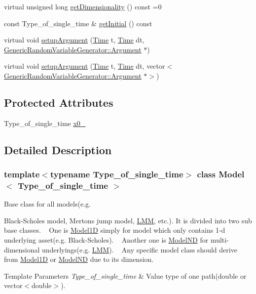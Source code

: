 \begin{DoxyCompactItemize}
virtual unsigned long \hyperlink{class_model_a26832ec2df24d7941783d3cd6d500898}{get\+Dimensionality} () const =0
\item 
const Type\+\_\+of\+\_\+single\+\_\+time \& \hyperlink{class_model_a22cdf510508e6cf3adc69e2bcd9d151e}{get\+Initial} () const
\item 
virtual void \hyperlink{class_model_a19ba3a18a45aad9012dbc6cbafb09e39}{setup\+Argument} (\hyperlink{_name_def_8h_ac2d3e0ba793497bcca555c7c2cf64ff3}{Time} t, \hyperlink{_name_def_8h_ac2d3e0ba793497bcca555c7c2cf64ff3}{Time} dt, \hyperlink{class_generic_random_variable_generator_1_1_argument}{Generic\+Random\+Variable\+Generator\+::\+Argument} $\ast$)
\item 
virtual void \hyperlink{class_model_a603717845fc9c6317d65a39409d10aed}{setup\+Argument} (\hyperlink{_name_def_8h_ac2d3e0ba793497bcca555c7c2cf64ff3}{Time} t, \hyperlink{_name_def_8h_ac2d3e0ba793497bcca555c7c2cf64ff3}{Time} dt, vector$<$ \hyperlink{class_generic_random_variable_generator_1_1_argument}{Generic\+Random\+Variable\+Generator\+::\+Argument} $\ast$$>$)
\end{DoxyCompactItemize}
\subsection*{Protected Attributes}
\begin{DoxyCompactItemize}
\item 
Type\+\_\+of\+\_\+single\+\_\+time \hyperlink{class_model_a8b547d019a51a21f539209227fbde146}{x0\+\_\+}
\end{DoxyCompactItemize}


\subsection{Detailed Description}
\subsubsection*{template$<$typename Type\+\_\+of\+\_\+single\+\_\+time$>$\newline
class Model$<$ Type\+\_\+of\+\_\+single\+\_\+time $>$}

Base class for all models(e.\+g. 

Black-\/\+Scholes model, Merton\textquotesingle{}s jump model, \hyperlink{class_l_m_m}{L\+MM}, etc.). It is divided into two sub base classes. ~\newline
One is \hyperlink{class_model1_d}{Model1D} simply for model which only contains 1-\/d underlying asset(e.\+g. Black-\/\+Scholes). ~\newline
Another one is \hyperlink{class_model_n_d}{Model\+ND} for multi-\/dimensional underlyings(e.\+g. \hyperlink{class_l_m_m}{L\+MM}). ~\newline
Any specific model class should derive from \hyperlink{class_model1_d}{Model1D} or \hyperlink{class_model_n_d}{Model\+ND} due to its dimension. 
\begin{DoxyTemplParams}{Template Parameters}
{\em Type\+\_\+of\+\_\+single\+\_\+time} & Value type of one path(double or vector$<$double$>$). \\
\hline
\end{DoxyTemplParams}


